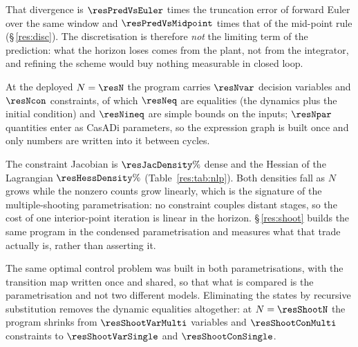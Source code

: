 That divergence is $\resPredVsEuler$ times the truncation error of forward Euler over the same window and $\resPredVsMidpoint$ times that of the mid-point rule (\S\,\ref{res:disc}). The discretisation is therefore \emph{not} the limiting term of the prediction: what the horizon loses comes from the plant, not from the integrator, and refining the scheme would buy nothing measurable in closed loop.


\label{res:nlp}


At the deployed $N=\resN$ the program carries $\resNvar$ decision variables and $\resNcon$ constraints, of which $\resNeq$ are equalities (the dynamics plus the initial condition) and $\resNineq$ are simple bounds on the inputs; $\resNpar$ quantities enter as CasADi parameters, so the expression graph is built once and only numbers are written into it between cycles.

The constraint Jacobian is $\resJacDensity\%$ dense and the Hessian of the Lagrangian $\resHessDensity\%$ (Table~\ref{res:tab:nlp}). Both densities fall as $N$ grows while the nonzero counts grow linearly, which is the signature of the multiple-shooting parametrisation: no constraint couples distant stages, so the cost of one interior-point iteration is linear in the horizon. \S\,\ref{res:shoot} builds the same program in the condensed parametrisation and measures what that trade actually is, rather than asserting it.


\label{res:shoot}


The same optimal control problem was built in both parametrisations, with the transition map written once and shared, so that what is compared is the parametrisation and not two different models. Eliminating the states by recursive substitution removes the dynamic equalities altogether: at $N=\resShootN$ the program shrinks from $\resShootVarMulti$ variables and $\resShootConMulti$ constraints to $\resShootVarSingle$ and $\resShootConSingle$.

